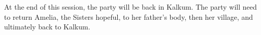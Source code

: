 At the end of this session, the party will be back in Kalkum.
The party will need to return Amelia, the Sisters hopeful, to her father's body, then her village, and ultimately back to Kalkum.
